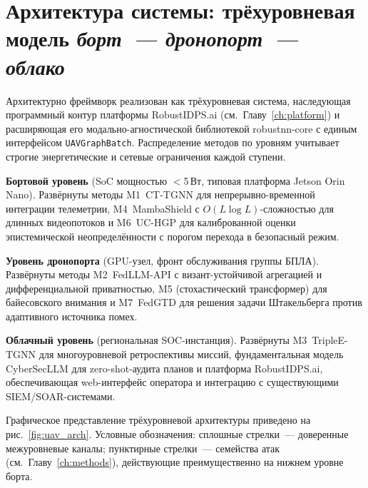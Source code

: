 \section{Архитектура системы: трёхуровневая модель \emph{борт~--- дронопорт~--- облако}}
\label{sec:uav_arch}

Архитектурно фреймворк реализован как трёхуровневая система, наследующая
программный контур платформы \textsf{RobustIDPS.ai}
(см.~Главу~\ref{ch:platform}) и расширяющая его модально-агностической
библиотекой \textsf{robustnn-core} с единым интерфейсом
\texttt{UAVGraphBatch}. Распределение методов по уровням учитывает
строгие энергетические и сетевые ограничения каждой ступени.

\noindent\textbf{Бортовой уровень} (SoC мощностью $<$5\,Вт, типовая
платформа Jetson Orin Nano). Развёрнуты методы \textsf{M1~CT-TGNN}
для непрерывно-временной интеграции телеметрии, \textsf{M4~MambaShield}
с $O(L\log L)$-сложностью для длинных видеопотоков и
\textsf{M6~UC-HGP} для калиброванной оценки эпистемической
неопределённости с порогом перехода в безопасный режим.

\noindent\textbf{Уровень дронопорта} (GPU-узел, фронт обслуживания
группы БПЛА). Развёрнуты методы \textsf{M2~FedLLM-API} с
визант-устойчивой агрегацией и дифференциальной приватностью,
\textsf{M5} (стохастический трансформер) для байесовского внимания и
\textsf{M7~FedGTD} для решения задачи Штакельберга против адаптивного
источника помех.

\noindent\textbf{Облачный уровень} (региональная SOC-инстанция).
Развёрнуты \textsf{M3~TripleE-TGNN} для многоуровневой ретроспективы
миссий, фундаментальная модель \textsf{CyberSecLLM} для zero-shot-аудита
планов и платформа \textsf{RobustIDPS.ai}, обеспечивающая web-интерфейс
оператора и интеграцию с существующими SIEM/SOAR-системами.

Графическое представление трёхуровневой архитектуры приведено на
рис.~\ref{fig:uav_arch}. Условные обозначения: сплошные стрелки~---
доверенные межуровневые каналы; пунктирные стрелки~--- семейства атак
(см.\ Главу~\ref{ch:methods}), действующие преимущественно на нижнем
уровне борта.

